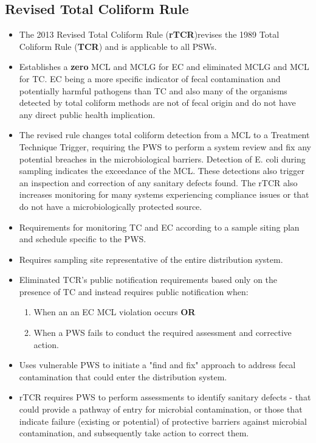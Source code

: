 \subsection{Revised Total Coliform Rule}
\begin{itemize}
\item The 2013 Revised Total Coliform Rule (\textbf{rTCR})revises the 1989 Total Coliform Rule (\textbf{TCR}) and is applicable to all PSWs. 
\item Establishes a \textbf{zero} MCL and MCLG for EC and eliminated MCLG and MCL for TC.  EC being a more specific indicator of fecal contamination and potentially harmful pathogens than
TC and also many of the organisms detected by total coliform methods are not of fecal origin and do not have any direct public health implication. 
\item The revised rule changes total coliform detection from a MCL to a Treatment Technique
Trigger, requiring the PWS to perform a system review and fix any potential breaches in
the microbiological barriers. Detection of E. coli during sampling indicates the
exceedance of the MCL. These detections also trigger an inspection and correction of any
sanitary defects found. The rTCR also increases monitoring for many systems experiencing compliance issues or that do not have a microbiologically protected source.
\item Requirements for monitoring TC and EC according to a sample siting plan and schedule specific to the PWS.
\item Requires sampling site representative of the entire distribution system.
\item Eliminated TCR's public notification requirements based only on the presence of TC and instead requires public notification when:
\begin{enumerate}
\item When an an EC MCL violation occurs \textbf{OR}
\item When a PWS fails to conduct the required assessment and corrective action.
\end{enumerate}
\item Uses vulnerable PWS to initiate a "find and fix" approach to address fecal contamination that could enter the distribution system.
\item rTCR requires PWS to perform assessments to identify sanitary defects - that could provide a pathway of entry for microbial contamination, or those that indicate failure (existing or potential) of protective barriers against microbial contamination, and subsequently take action to correct them.

\end{itemize}
